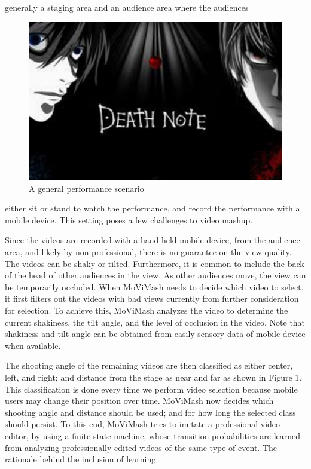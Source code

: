 \documentclass{sig-alternate-05-2015}
\begin{document}
generally a staging area and an audience area where the audiences
\begin{figure}
\centering
\includegraphics{note.pdf}
\caption{A general performance scenario}
\end{figure}
either sit or stand to watch the performance, and record the performance
with a mobile device. This setting poses a few challenges to
video mashup.\par
Since the videos are recorded with a hand-held mobile device,
from the audience area, and likely by non-professional, there is no
guarantee on the view quality. The videos can be shaky or tilted.
Furthermore, it is common to include the back of the head of other
audiences in the view. As other audiences move, the view can be
temporarily occluded. When MoViMash needs to decide which
video to select, it first filters out the videos with bad views currently
from further consideration for selection. To achieve this, MoViMash
analyzes the video to determine the current shakiness, the tilt
angle, and the level of occlusion in the video. Note that shakiness
and tilt angle can be obtained from easily sensory data of mobile
device when available.\par
The shooting angle of the remaining videos are then classified as
either center, left, and right; and distance from the stage as near and
far as shown in Figure 1. This classification is done every time we
perform video selection because mobile users may change their position
over time. MoViMash now decides which shooting angle and
distance should be used; and for how long the selected class should
persist. To this end, MoViMash tries to imitate a professional video
editor, by using a finite state machine, whose transition probabilities
are learned from analyzing professionally edited videos of the
same type of event. The rationale behind the inclusion of learning
\end{document}
